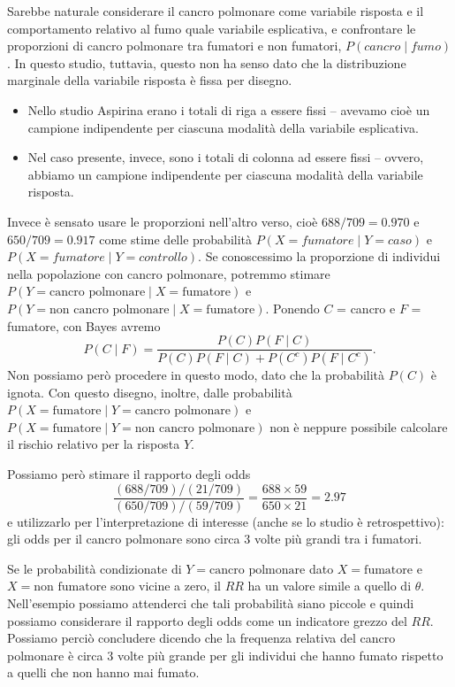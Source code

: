 Sarebbe naturale considerare il cancro polmonare come variabile risposta  e il comportamento relativo al fumo quale variabile esplicativa, e confrontare le proporzioni di cancro
polmonare tra fumatori e non fumatori, $P(cancro \mid fumo)$.
In questo studio, tuttavia, questo non ha senso dato che la distribuzione marginale della variabile risposta è fissa per disegno.
\begin{itemize}
    \item Nello studio Aspirina erano i totali di riga a essere fissi -- avevamo cioè un campione indipendente per ciascuna modalità della variabile esplicativa.
    \item Nel caso presente, invece, sono i totali di colonna ad essere fissi -- ovvero, abbiamo un campione indipendente per ciascuna modalità della variabile risposta.
\end{itemize}
Invece è sensato usare le proporzioni nell'altro verso, cioè $688/709 = 0.970$ e $650/709=0.917$ come stime delle probabilità $P(X = fumatore \mid Y = caso)$ e $P(X = fumatore \mid Y = controllo)$.
Se conoscessimo la proporzione di individui nella popolazione con cancro polmonare, potremmo stimare
$P(Y = \text{cancro polmonare} \mid X = \text{fumatore})$ e $P(Y = \text{non cancro polmonare} \mid X = \text{fumatore})$.
Ponendo $C$ = cancro e $F$ = fumatore, con Bayes avremo
\[
P(C \mid F)=\frac{P(C)P(F \mid C)}{P(C)P(F \mid C) + P(C^c)P(F \mid C^c)}.
\]
Non possiamo però procedere in questo modo, dato che la probabilità $P(C)$ è ignota.
Con questo disegno, inoltre, dalle probabilità $P( X = \text{fumatore} \mid Y = \text{cancro polmonare})$ e $P(X = \text{fumatore} \mid Y = \text{non cancro polmonare})$ non è neppure possibile  calcolare  il rischio relativo per la risposta $Y$.

Possiamo però stimare il rapporto degli odds
\[
\frac{(688/709)/(21/709)}{(650/709)/(59/709)}=\frac{688 \times
59}{650 \times 21}=  2.97
\]
e utilizzarlo per l'interpretazione di interesse (anche se lo studio è retrospettivo): gli odds per il cancro polmonare sono circa 3 volte più grandi tra i fumatori.

Se le probabilità condizionate di $Y = \text{cancro polmonare}$ dato $X = \text{fumatore}$ e $X = \text{non fumatore}$ sono vicine a zero, il $RR$ ha un valore simile a quello di
$\theta$.
Nell'esempio possiamo attenderci che tali probabilità siano piccole e quindi possiamo considerare il rapporto degli odds come un indicatore grezzo del $RR$.
Possiamo perciò concludere dicendo che la frequenza relativa del cancro polmonare è circa 3 volte più grande per gli individui che hanno fumato rispetto a quelli che non hanno mai
fumato.

